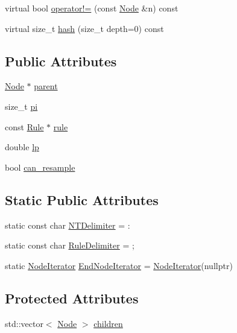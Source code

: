 \begin{DoxyCompactItemize}
virtual bool \hyperlink{class_node_a1ff12be4d2355edddee1fbe893f0c8a8}{operator!=} (const \hyperlink{class_node}{Node} \&n) const
\item 
virtual size\+\_\+t \hyperlink{class_node_a212f2e1ba4ff71de6954b0b791d89979}{hash} (size\+\_\+t depth=0) const
\end{DoxyCompactItemize}
\subsection*{Public Attributes}
\begin{DoxyCompactItemize}
\item 
\hyperlink{class_node}{Node} $\ast$ \hyperlink{class_node_ad8184598cdea70e4bbdfd76f2b0f9e85}{parent}
\item 
size\+\_\+t \hyperlink{class_node_ad8e140a5af4e5c312141f2b7af255520}{pi}
\item 
const \hyperlink{class_rule}{Rule} $\ast$ \hyperlink{class_node_a02f5c9463cceb270ad5730760f19c722}{rule}
\item 
double \hyperlink{class_node_a298eaa3743b774a3f9ef396e1dc42a08}{lp}
\item 
bool \hyperlink{class_node_a98c14a51b240fbc7e438f40a12276257}{can\+\_\+resample}
\end{DoxyCompactItemize}
\subsection*{Static Public Attributes}
\begin{DoxyCompactItemize}
\item 
static const char \hyperlink{class_node_abd26102ffbe2a3e00c34bed5508b3234}{N\+T\+Delimiter} = \textquotesingle{}\+:\textquotesingle{}
\item 
static const char \hyperlink{class_node_ab58932e82964fb75ba806870c4069dc2}{Rule\+Delimiter} = \textquotesingle{};\textquotesingle{}
\item 
static \hyperlink{class_node_1_1_node_iterator}{Node\+Iterator} \hyperlink{class_node_a336943f2e37a2b6fcbe8b47634719dec}{End\+Node\+Iterator} = \hyperlink{class_node_1_1_node_iterator}{Node\+Iterator}(nullptr)
\end{DoxyCompactItemize}
\subsection*{Protected Attributes}
\begin{DoxyCompactItemize}
\item 
std\+::vector$<$ \hyperlink{class_node}{Node} $>$ \hyperlink{class_node_af7ddc81358470c3bf7a7819c8b77f53d}{children}
\end{DoxyCompactItemize}


